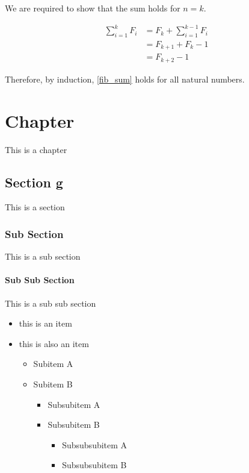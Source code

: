 \documentclass{uom-coursework}
\begin{document}
We are required to show that the sum holds for $n = k$.

\begin{align*}
  \sum_{i = 1}^{k} F_i & = F_{k} + \sum_{i = 1}^{k - 1} F_i\\
                       & = F_{k + 1} + F_{k} - 1\\
                       & = F_{k + 2} - 1 
\end{align*}

Therefore, by induction, \ref{fib_sum} holds for all natural
numbers.

\chapter{Chapter}
This is a chapter
\section{Section g}
This is a section
\subsection{Sub Section}
This is a sub section
\subsubsection{Sub Sub Section}
This is a sub sub section

\begin{itemize}
  \item this is an item
  \item this is also an item
  \begin{itemize}
    \item Subitem A
    \item Subitem B
    \begin{itemize}
      \item Subsubitem A
      \item Subsubitem B
      \begin{itemize}
        \item Subsubsubitem A
        \item Subsubsubitem B
      \end{itemize}
    \end{itemize}
  \end{itemize}
\end{itemize}
\end{document}
